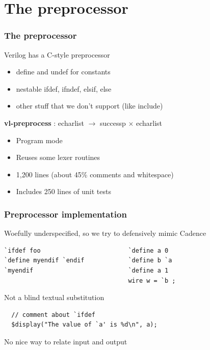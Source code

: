 \documentclass{beamer}
\newcommand{\Highlight}[1]{{\color{Highlight}#1}}
\newcommand{\SmallSkip}{\vspace{0.5cm}\noindent}
\begin{document}
\section[The preprocessor]{The preprocessor}
\begin{frame}[fragile]
\frametitle{The preprocessor}

Verilog has a C-style preprocessor
\begin{itemize}
\item define and undef for constants
\item nestable ifdef, ifndef, elsif, else
\item other stuff that we don't support (like include)
\end{itemize}

\SmallSkip
{\bf vl-preprocess} : echarlist $\rightarrow$ successp $\times$ echarlist
\begin{itemize}
\item Program mode
\item Reuses some lexer routines
\item 1,200 lines (about 45\% comments and whitespace)
\item Includes 250 lines of unit tests
\end{itemize}

\end{frame}

\begin{frame}[fragile]
\frametitle{Preprocessor implementation}

Woefully \Highlight{underspecified}, so we try to defensively mimic Cadence
\begin{verbatim}
`ifdef foo                        `define a 0
`define myendif `endif            `define b `a
`myendif                          `define a 1
                                  wire w = `b ;
\end{verbatim}

Not a blind textual substitution
\begin{verbatim}
  // comment about `ifdef 
  $display("The value of `a' is %d\n", a);
\end{verbatim}

\SmallSkip
No nice way to relate input and output

\end{frame}
\end{document}

